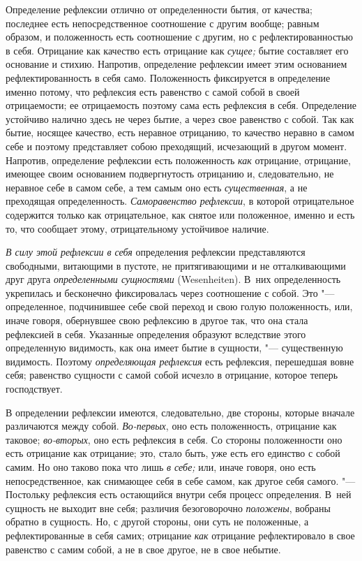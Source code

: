 Определение рефлексии отлично от определенности бытия, от качества;
последнее есть непосредственное соотношение с другим вообще; равным
образом, и положенность есть соотношение с другим, но с рефлектированностью
в себя. Отрицание как качество есть отрицание как
{\em сущее;} бытие составляет его основание и стихию.
Напротив, определение рефлексии имеет этим основанием рефлектированность в
себя само. Положенность фиксируется в определение именно потому, что
рефлексия есть равенство с самой собой в своей отрицаемости; ее
отрицаемость поэтому сама есть рефлексия в себя. Определение устойчиво
налично здесь не через бытие, а через свое равенство с собой. Так как
бытие, носящее качество, есть неравное отрицанию, то качество неравно в
самом себе и поэтому представляет собою преходящий, исчезающий в другом
момент. Напротив, определение рефлексии есть положенность
{\em как} отрицание, отрицание, имеющее своим
основанием подвергнутость отрицанию и, следовательно, не неравное себе в
самом себе, а тем самым оно есть {\em существенная}, а
не преходящая определенность. {\em Саморавенство
рефлексии}, в которой отрицательное содержится только как отрицательное,
как снятое или положенное, именно и есть то, что сообщает этому,
отрицательному устойчивое наличие.

{\em В силу этой рефлексии в себя} определения рефлексии
представляются свободными, витающими в пустоте, не притягивающими и не
отталкивающими друг друга {\em определенными
сущностями} (Wesenheiten). В~них определенность укрепилась и бесконечно
фиксировалась через соотношение с собой. Это "--- определенное, подчинившее
себе свой переход и свою голую положенность, или, иначе говоря, обернувшее
свою рефлексию в другое так, что она стала рефлексией в себя. Указанные
определения образуют вследствие этого определенную видимость, как она имеет
бытие в сущности, "--- существенную видимость. Поэтому
{\em определяющая рефлексия} есть рефлексия, перешедшая
вовне себя; равенство сущности с самой собой исчезло в отрицание, которое
теперь господствует.

В определении рефлексии имеются, следовательно, две стороны, которые вначале
различаются между собой. {\em Во-первых}, оно есть
положенность, отрицание как таковое; {\em во-вторых},
оно есть рефлексия в себя. Со стороны положенности оно есть отрицание как
отрицание; это, стало быть, уже есть его единство с собой самим. Но оно
таково пока что лишь {\em в себе;} или, иначе говоря,
оно есть непосредственное, как снимающее себя в себе самом, как другое себя
самого. "--- Постольку рефлексия есть остающийся внутри себя процесс
определения. В~ней сущность не выходит вне себя; различия безоговорочно
{\em положены}, вобраны обратно в сущность. Но, с
другой стороны, они суть не положенные, а рефлектированные в себя самих;
отрицание {\em как} отрицание рефлектировало в свое
равенство с самим собой, а не в свое другое, не в свое небытие.

